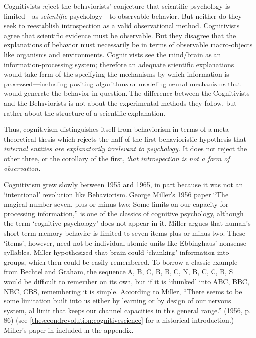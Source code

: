 \begin{refsection}
Cognitivists reject the behaviorists' conjecture that scientific psychology is limited---as \emph{scientific} psychology---to observable behavior. But neither do they seek to reestablish introspection as a valid observational method. Cognitivists agree that scientific evidence must be observable. But they disagree that the explanations of behavior must necessarily be in terms of observable macro-objects like organisms and environments. Cognitivists see the mind\slash brain as an information-processing system; therefore an adequate scientific explanations would take form of the specifying the mechanisms by which information is processed---including positing algorithms or modeling neural mechanisms that would generate the behavior in question. The difference between the Cognitivists and the Behaviorists is not about the experimental methods they follow, but rather about the structure of a scientific explanation.

Thus, cognitivism distinguishes itself from behaviorism in terms of a meta-theoretical thesis which rejects the half of the first behavioristic hypothesis that \emph{internal entities are explanatorily irrelevant to psychology.} It does not reject the other three, or the corollary of the first, \emph{that introspection is not a form of observation.}

Cognitivism grew slowly between 1955 and 1965, in part because it was not an `intentional' revolution like Behaviorism. George Miller's 1956 paper ``The magical number seven, plus or minus two: Some limits on our capacity for processing information,'' is one of the classics of cognitive psychology, although the term `cognitive psychology' does not appear in it. Miller argues that human's short-term memory behavior is limited to seven items plus or minus two. These `items', however, need not be individual atomic units like Ebbinghaus' nonsense syllables. Miller hypothesized that brain could `chunking' information into groups, which then could be easily remembered. To borrow a classic example from Bechtel and Graham, the sequence A, B, C, B, B, C, N, B, C, C, B, S would be difficult to remember on its own, but if it is `chunked' into ABC, BBC, NBC, CBS, remembering it is simple. According to Miller, ``There seems to be some limitation built into us either by learning or by design of our nervous system, al limit that keeps our channel capacities in this general range.'' (1956, p. 86) (see \ref{thesecondrevolution:cognitivescience} for a historical introduction.) Miller's paper in included in the appendix.


\end{refsection}
